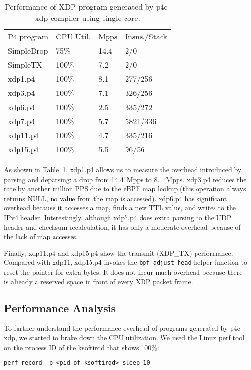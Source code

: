 \begin{table}
\centering
\small
\begin{tabular}{llll}
  \underline{P4 program} & \underline{CPU Util.} & \underline{Mpps} & \underline{Insns./Stack}\\
  SimpleDrop & 75\% & 14.4 & 2/0 \\
  SimpleTX & 100\% & 7.2 & 2/0 \\
  xdp1.p4 &  100\% &  8.1 & 277/256 \\
  xdp3.p4 &  100\% &  7.1 & 326/256 \\
  xdp6.p4 &  100\% &  2.5 & 335/272 \\
  xdp7.p4 &  100\% &  5.7 & 5821/336 \\
  xdp11.p4 &  100\% &  4.7  & 335/216 \\
  xdp15.p4 &  100\% &  5.5 & 96/56\\
\end{tabular}
\caption{\footnotesize Performance of XDP program generated by
  p4c-xdp compiler using single core.}
\label{tab:perf}
\end{table}

As shown in Table~\ref{tab:perf}, xdp1.p4 allows us to measure the
overhead introduced by parsing and deparsing: a drop from 14.4~Mpps to
8.1~Mpps.  xdp3.p4 reduces the rate by another million PPS due to the
eBPF map lookup (this operation always returns NULL, no value from the
map is accessed).  xdp6.p4 has significant overhead because it
accesses a map, finds a new TTL value, and writes to the IPv4 header.
Interestingly, although xdp7.p4 does extra parsing to the UDP header
and checksum recalculation, it has only a moderate overhead because of
the lack of map accesses.

Finally, xdp11.p4 and xdp15.p4 show the transmit (XDP\_TX)
performance.  Compared with xdp11, xdp15.p4 invokes the
\texttt{bpf\_adjust\_head} helper function to reset the pointer for extra
bytes.  It does not incur much overhead because there
is already a reserved space in front of every XDP packet frame.

\subsection{Performance Analysis}

To further understand the performance overhead of programs generated
by p4c-xdp, we started to brake down the CPU utilization. We used the Linux
perf tool on the process ID of the ksoftirqd that shows 100\%:
\begin{lstlisting}[frame=none]
perf record -p <pid of ksoftirqd> sleep 10
\end{lstlisting}


